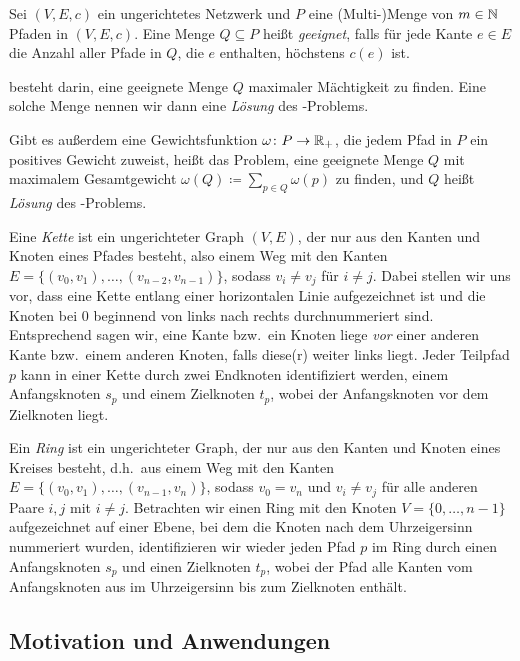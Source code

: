 \begin{definition}
    Sei $(V,E,c)$ ein ungerichtetes Netzwerk und $P$ eine (Multi-)Menge von $m \in \mathbb N$ Pfaden in $(V,E,c)$.
    Eine Menge $Q \subseteq P$ heißt {\em geeignet}, falls für jede Kante $e \in E$ die Anzahl aller Pfade in $Q$,
    die $e$ enthalten, höchstens $c(e)$ ist.
    
    {\em \CallControl} besteht darin, eine geeignete Menge $Q$ maximaler Mächtigkeit zu finden.
    Eine solche Menge nennen wir dann eine {\em Lösung} des \CallControl-Problems.
    
    Gibt es außerdem eine Gewichtsfunktion $\omega \colon P \rightarrow \mathbb R_+$, die jedem Pfad in $P$ ein 
    positives Gewicht zuweist, heißt das Problem, eine geeignete Menge $Q$ mit maximalem Gesamtgewicht
    $\omega(Q) \coloneqq \sum_{p \in Q} \omega(p)$ zu finden, {\em \WeightedCallControl} und $Q$ heißt 
    {\em Lösung} des \WeightedCallControl-Problems.
\end{definition}

Eine {\em Kette} ist ein ungerichteter Graph $(V,E)$, der nur aus den Kanten und Knoten eines Pfades besteht, also einem
Weg mit den Kanten $E=\{(v_0, v_1),\dots,(v_{n-2},v_{n-1})\}$, sodass $v_i \neq v_j$ für $i \neq j$.
Dabei stellen wir uns vor, dass eine Kette entlang einer horizontalen Linie aufgezeichnet ist und die
Knoten bei $0$ beginnend von links nach rechts durchnummeriert sind. 
Entsprechend sagen wir, eine Kante bzw.\ ein Knoten liege {\em vor} einer anderen Kante bzw.\ einem anderen Knoten, 
falls diese(r) weiter links liegt.
Jeder Teilpfad $p$ kann in einer Kette durch zwei Endknoten identifiziert werden, einem Anfangsknoten $s_p$ und einem 
Zielknoten $t_p$, wobei der Anfangsknoten vor dem Zielknoten liegt.

Ein {\em Ring} ist ein ungerichteter Graph, der nur aus den Kanten und Knoten eines Kreises besteht, d.h.\ aus einem Weg 
mit den Kanten $E=\{(v_0, v_1),\dots,(v_{n-1},v_{n})\}$, sodass $v_0 = v_n$ und $v_i \neq v_j$ für alle anderen Paare $i,j$ 
mit $i \neq j$.
Betrachten wir einen Ring mit den Knoten $V=\{0, \dots , n-1\}$ aufgezeichnet auf einer Ebene, bei dem die Knoten nach
dem Uhrzeigersinn nummeriert wurden, identifizieren wir wieder jeden Pfad $p$ im Ring durch einen Anfangsknoten $s_p$ und einen Zielknoten 
$t_p$, wobei der Pfad alle Kanten vom Anfangsknoten aus im Uhrzeigersinn bis zum Zielknoten enthält.

\subsection{Motivation und Anwendungen}\label{subsec:motivationUndAnwendungen}

